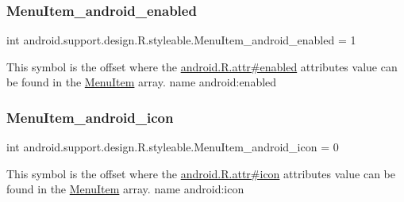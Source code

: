 \subsubsection{\texorpdfstring{Menu\+Item\+\_\+android\+\_\+enabled}{MenuItem\_android\_enabled}}
{\footnotesize\ttfamily int android.\+support.\+design.\+R.\+styleable.\+Menu\+Item\+\_\+android\+\_\+enabled = 1\hspace{0.3cm}{\ttfamily [static]}}

This symbol is the offset where the \hyperlink{}{android.\+R.\+attr\#enabled} attribute\textquotesingle{}s value can be found in the \hyperlink{classandroid_1_1support_1_1design_1_1R_1_1styleable_a4c90afdbb461f2bfba191da26fbc881c}{Menu\+Item} array.  name android\+:enabled \mbox{\label{classandroid_1_1support_1_1design_1_1R_1_1styleable_aad27da563931a43a215291fed76d8fc1}} 
\subsubsection{\texorpdfstring{Menu\+Item\+\_\+android\+\_\+icon}{MenuItem\_android\_icon}}
{\footnotesize\ttfamily int android.\+support.\+design.\+R.\+styleable.\+Menu\+Item\+\_\+android\+\_\+icon = 0\hspace{0.3cm}{\ttfamily [static]}}

This symbol is the offset where the \hyperlink{}{android.\+R.\+attr\#icon} attribute\textquotesingle{}s value can be found in the \hyperlink{classandroid_1_1support_1_1design_1_1R_1_1styleable_a4c90afdbb461f2bfba191da26fbc881c}{Menu\+Item} array.  name android\+:icon \mbox{\label{classandroid_1_1support_1_1design_1_1R_1_1styleable_afbda85862c50bb6b1d1c07d43301305f}} 
